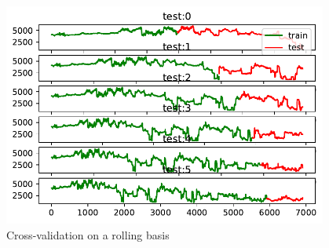 \begin{figure}[H]
\begin{center}\includegraphics[width = 0.95\textwidth]{figures/rolling_basis.pdf}\end{center}
\vspace{-0.7cm}
\caption{Cross-validation on a rolling basis}
\label{fig:rolling_basis}
\end{figure}
